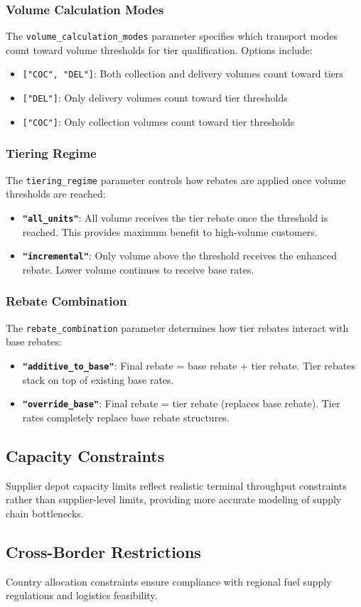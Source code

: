 \subsubsection{Volume Calculation Modes}
The \texttt{volume\_calculation\_modes} parameter specifies which transport modes count toward volume thresholds for tier qualification. Options include:
\begin{itemize}
    \item \texttt{["COC", "DEL"]}: Both collection and delivery volumes count toward tiers
    \item \texttt{["DEL"]}: Only delivery volumes count toward tier thresholds
    \item \texttt{["COC"]}: Only collection volumes count toward tier thresholds
\end{itemize}

\subsubsection{Tiering Regime}
The \texttt{tiering\_regime} parameter controls how rebates are applied once volume thresholds are reached:
\begin{itemize}
    \item \textbf{\texttt{"all\_units"}}: All volume receives the tier rebate once the threshold is reached. This provides maximum benefit to high-volume customers.
    \item \textbf{\texttt{"incremental"}}: Only volume above the threshold receives the enhanced rebate. Lower volume continues to receive base rates.
\end{itemize}

\subsubsection{Rebate Combination}
The \texttt{rebate\_combination} parameter determines how tier rebates interact with base rebates:
\begin{itemize}
    \item \textbf{\texttt{"additive\_to\_base"}}: Final rebate = base rebate + tier rebate. Tier rebates stack on top of existing base rates.
    \item \textbf{\texttt{"override\_base"}}: Final rebate = tier rebate (replaces base rebate). Tier rates completely replace base rebate structures.
\end{itemize}

\subsection{Capacity Constraints}
Supplier depot capacity limits reflect realistic terminal throughput constraints rather than supplier-level limits, providing more accurate modeling of supply chain bottlenecks.

\subsection{Cross-Border Restrictions}
Country allocation constraints ensure compliance with regional fuel supply regulations and logistics feasibility.